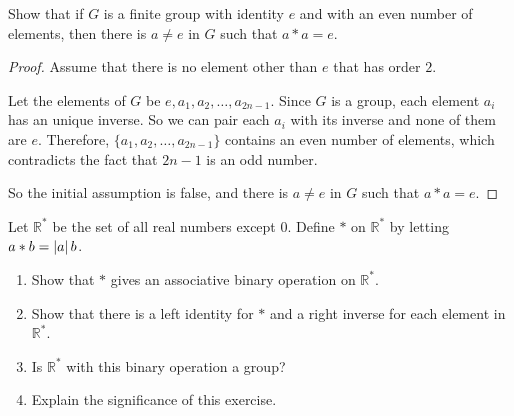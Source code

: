 \newpage
\begin{exercise}
    Show that if $G$ is a finite group with identity $e$ and with an even number of elements, then there is $a\ne e$ in $G$ such that $a * a = e$.
\end{exercise}

\begin{proof}
    Assume that there is no element other than $e$ that has order $2$.

    Let the elements of $G$ be $e, a_{1}, a_{2}, \ldots, a_{2n-1}$. Since $G$ is a group, each element $a_{i}$ has an unique inverse. So we can pair each $a_{i}$ with its inverse and none of them are $e$. Therefore, $\{ a_{1}, a_{2}, \ldots, a_{2n-1} \}$ contains an even number of elements, which contradicts the fact that $2n - 1$ is an odd number.

    So the initial assumption is false, and there is $a\ne e$ in $G$ such that $a * a = e$.
\end{proof}

\newpage
\begin{exercise}
    Let $\mathbb{R}^{*}$ be the set of all real numbers except $0$. Define $*$ on $\mathbb{R}^{*}$ by letting $a * b = \left\vert{a}\right\vert b$.
    \begin{enumerate}[label={\textbf{\alph*.}}]
        \item Show that $*$ gives an associative binary operation on $\mathbb{R}^{*}$.
        \item Show that there is a left identity for $*$ and a right inverse for each element in $\mathbb{R}^{*}$.
        \item Is $\mathbb{R}^{*}$ with this binary operation a group?
        \item Explain the significance of this exercise.
    \end{enumerate}
\end{exercise}

